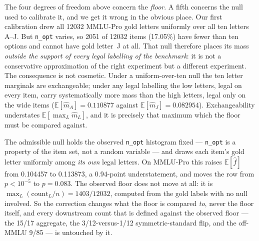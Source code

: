 The four degrees of freedom above concern the \emph{floor}. A fifth concerns the null used to calibrate it, and we get it wrong in the obvious place. Our first calibration drew all 12032 MMLU-Pro gold letters uniformly over all ten letters A--J. But \texttt{n\_opt} varies, so 2051 of 12032 items (17.05\%) have fewer than ten options and cannot have gold letter~J at all. That null therefore places its mass \emph{outside the support of every legal labelling of the benchmark}: it is not a conservative approximation of the right experiment but a different experiment. The consequence is not cosmetic. Under a uniform-over-ten null the ten letter marginals are exchangeable; under any legal labelling the low letters, legal on every item, carry systematically more mass than the high letters, legal only on the wide items ($\mathbb{E}[\hat m_A]=0.110877$ against $\mathbb{E}[\hat m_J]=0.082954$). Exchangeability understates $\mathbb{E}[\max_L \hat m_L]$, and it is precisely that maximum which the floor must be compared against.

The admissible null holds the observed \texttt{n\_opt} histogram fixed --- \texttt{n\_opt} is a property of the item set, not a random variable --- and draws each item's gold letter uniformly among \emph{its own} legal letters. On MMLU-Pro this raises $\mathbb{E}[\hat f]$ from 0.104457 to 0.113873, a 0.94-point understatement, and moves the row from $p<10^{-5}$ to $p=0.083$. The observed floor does not move at all: it is $\max_L(\text{count}_L/n)=1403/12032$, computed from the gold labels with no null involved. So the correction changes what the floor is compared \emph{to}, never the floor itself, and every downstream count that is defined against the observed floor --- the 15/17 aggregate, the 3/12-versus-1/12 symmetric-standard flip, and the off-MMLU 9/85 --- is untouched by it.

